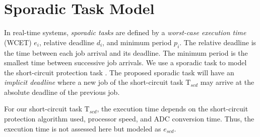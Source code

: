 \documentclass[11pt,oneside]{report}
\begin{document}
    \section{Sporadic Task Model}
    In real-time systems, \textit{sporadic tasks} are defined by a \textit{worst-case execution time} (WCET) $e_{i}$, relative deadline $d_{i}$, and minimum period $p_{i}$. The relative deadline is the time between each job arrival and its deadline. The minimum period is the smallest time between successive job arrivals. We use a sporadic task to model the short-circuit protection task \cite{sporadicTaskModel}. The proposed sporadic task will have an \textit{implicit deadline} where a new job of the short-circuit task $\mathrm{T}_{scd}$ may arrive at the absolute deadline of the previous job.
    
    For our short-circuit task $\mathrm{T}_{scd}$, the execution time depends on the short-circuit protection algorithm used, processor speed, and ADC conversion time. Thus, the execution time is not assessed here but modeled as $e_{scd}$.
    
\end{document}
